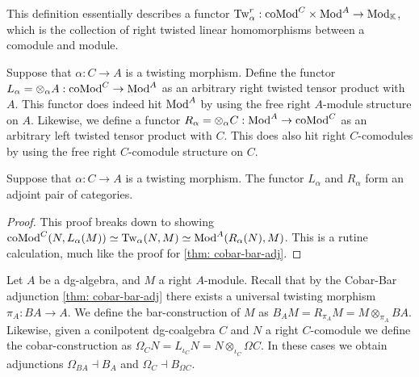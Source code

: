 \documentclass[../thesis.tex]{subfiles}
\begin{document}
            This definition essentially describes a functor $\tt{Tw}_\alpha^r : \tt{coMod}^C \times \tt{Mod}^A \rightarrow \tt{Mod}_\mathbb{K}$, which is the collection of right twisted linear homomorphisms between a comodule and module.

            Suppose that $\alpha : C \rightarrow A$ is a twisting morphism. Define the functor $L_\alpha = \otimes_\alpha A : \tt{coMod}^C \rightarrow \tt{Mod}^A$ as an arbitrary right twisted tensor product with $A$. This functor does indeed hit $\tt{Mod}^A$ by using the free right $A$-module structure on $A$. Likewise, we define a functor $R_\alpha = \otimes_\alpha C : \tt{Mod}^A \rightarrow \tt{coMod}^C$ as an arbitrary left twisted tensor product with $C$. This does also hit right $C$-comodules by using the free right $C$-comodule structure on $C$.

            \begin{proposition}
                Suppose that $\alpha : C \rightarrow A$ is a twisting morphism. The functor $L_\alpha$ and $R_\alpha$ form an adjoint pair of categories.
                \begin{center}
                \end{center}
            \end{proposition}

            \begin{proof}
                This proof breaks down to showing $\tt{coMod}^C(N, L_\alpha(M))\simeq \tt{Tw}_\alpha(N,M) \simeq \tt{Mod}^A(R_\alpha(N),M)$. This is a rutine calculation, much like the proof for \ref{thm: cobar-bar-adj}.
            \end{proof}

            Let $A$ be a dg-algebra, and $M$ a right $A$-module. Recall that by the Cobar-Bar adjunction \ref{thm: cobar-bar-adj} there exists a universal twisting morphism $\pi_A : BA \rightarrow A$. We define the bar-construction of $M$ as $B_AM = R_{\pi_A}M = M\otimes_{\pi_A}BA$. Likewise, given a conilpotent dg-coalgebra $C$ and $N$ a right $C$-comodule we define the cobar-construction as $\Omega_CN = L_{\iota_C}N = N\otimes_{\iota_C}\Omega C$. In these cases we obtain adjunctions $\Omega_{BA} \dashv B_A$ and $\Omega_C \dashv B_{\Omega C}$.
\end{document}
